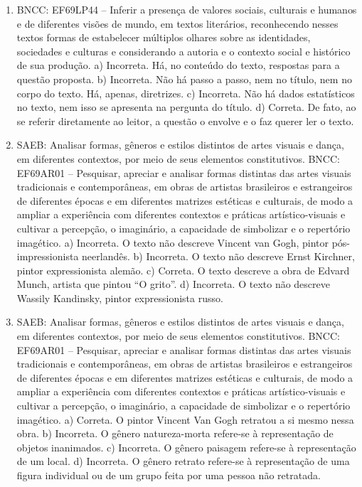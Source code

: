 \begin{enumerate}
\item
BNCC: EF69LP44 -- Inferir a presença de valores sociais, culturais e
humanos e de diferentes visões de mundo, em textos literários,
reconhecendo nesses textos formas de estabelecer múltiplos olhares sobre
as identidades, sociedades e culturas e considerando a autoria e o
contexto social e histórico de sua produção. a) Incorreta. Há, no conteúdo do texto, respostas para a questão proposta. b) Incorreta. Não há passo a passo, nem no título, nem no corpo do texto. Há, apenas, diretrizes. c) Incorreta. Não há dados estatísticos no texto, nem isso se apresenta na pergunta do título. d) Correta. De fato, ao se referir diretamente ao leitor, a questão o envolve e o faz querer ler o texto.

\item
SAEB: Analisar formas, gêneros e estilos distintos de artes visuais e
dança, em diferentes contextos, por meio de seus elementos
constitutivos.
BNCC: EF69AR01 -- Pesquisar, apreciar e analisar formas distintas das
artes visuais tradicionais e contemporâneas, em obras de artistas
brasileiros e estrangeiros de diferentes épocas e em diferentes matrizes
estéticas e culturais, de modo a ampliar a experiência com diferentes
contextos e práticas artístico-visuais e cultivar a percepção, o
imaginário, a capacidade de simbolizar e o repertório imagético.
a) Incorreta. O texto não descreve Vincent van Gogh, pintor pós-impressionista neerlandês.
b) Incorreta. O texto não descreve Ernst Kirchner, pintor expressionista alemão.
c) Correta. O texto descreve a obra de Edvard Munch, artista que pintou ``O grito''.
d) Incorreta. O texto não descreve Wassily Kandinsky, pintor expressionista russo.

\item
SAEB: Analisar formas, gêneros e estilos distintos de artes visuais e
dança, em diferentes contextos, por meio de seus elementos
constitutivos.
BNCC: EF69AR01 -- Pesquisar, apreciar e analisar formas distintas das
artes visuais tradicionais e contemporâneas, em obras de artistas
brasileiros e estrangeiros de diferentes épocas e em diferentes matrizes
estéticas e culturais, de modo a ampliar a experiência com diferentes
contextos e práticas artístico-visuais e cultivar a percepção, o
imaginário, a capacidade de simbolizar e o repertório imagético.
a) Correta. O pintor Vincent Van Gogh retratou a si mesmo nessa obra.
b) Incorreta. O gênero natureza-morta refere-se à representação de
  objetos inanimados.
c) Incorreta. O gênero paisagem refere-se à representação de um local.
d) Incorreta. O gênero retrato refere-se à representação de uma figura
  individual ou de um grupo feita por uma pessoa não retratada.


\end{enumerate}
